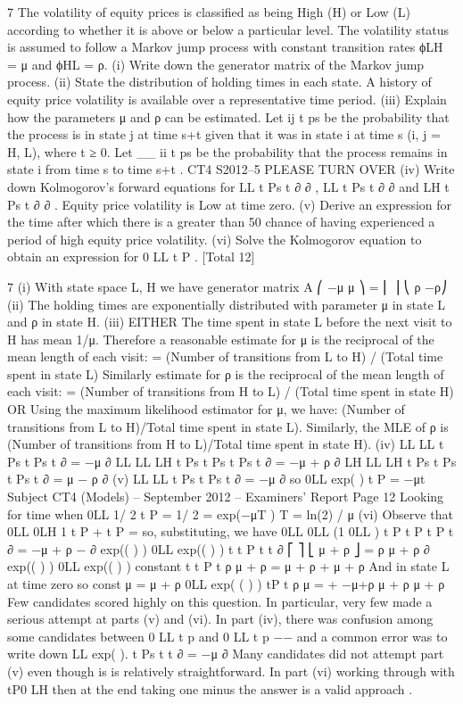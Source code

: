 7 The volatility of equity prices is classified as being High (H) or Low (L) according to
whether it is above or below a particular level. The volatility status is assumed to
follow a Markov jump process with constant transition rates ϕLH = μ and ϕHL = ρ.
(i) Write down the generator matrix of the Markov jump process. 
(ii) State the distribution of holding times in each state. 
A history of equity price volatility is available over a representative time period.
(iii) Explain how the parameters μ and ρ can be estimated. 
Let ij
t ps be the probability that the process is in state j at time s+t given that it was in
state i at time s (i, j = H, L), where t ≥ 0. Let
__
ii
t ps be the probability that the process
remains in state i from time s to time s+t .
CT4 S2012–5 PLEASE TURN OVER
(iv) Write down Kolmogorov’s forward equations for LL
t Ps
t
∂
∂
, LL
t Ps
t
∂
∂
and
LH
t Ps
t
∂
∂
. 
Equity price volatility is Low at time zero.
(v) Derive an expression for the time after which there is a greater than 50%
chance of having experienced a period of high equity price volatility. 
(vi) Solve the Kolmogorov equation to obtain an expression for 0
LL
t P . 
[Total 12]


7
(i) With state space {L, H} we have generator matrix
A
⎛ −μ μ ⎞
= ⎜ ⎟ ⎝ ρ −ρ⎠
(ii) The holding times are exponentially distributed with parameter μ in state L and ρ in
state H.
(iii) EITHER
The time spent in state L before the next visit to H has mean 1/μ.
Therefore a reasonable estimate for μ is the reciprocal of the mean length of each
visit:
= (Number of transitions from L to H) / (Total time spent in state L)
Similarly estimate for ρ is the reciprocal of the mean length of each visit:
= (Number of transitions from H to L) / (Total time spent in state H)
OR
Using the maximum likelihood estimator for μ, we have:
(Number of transitions from L to H)/Total time spent in state L).
Similarly, the MLE of ρ is
(Number of transitions from H to L)/Total time spent in state H).
(iv) LL LL
t Ps t Ps
t
∂
= −μ
∂
LL LL LH
t Ps t Ps t Ps
t
∂
= −μ + ρ
∂
LH LL LH
t Ps t Ps t Ps
t
∂
= μ − ρ
∂
(v) LL LL
t Ps t Ps
t
∂
= −μ
∂
so 0LL exp( )
t P = −μt
Subject CT4 (Models) – September 2012 – Examiners’ Report
Page 12
Looking for time when 0LL 1/ 2
t P =
1/ 2 = exp(−μT )
T = ln(2) / μ
(vi) Observe that 0LL 0LH 1
t P + t P =
so, substituting, we have
0LL 0LL (1 0LL )
t P t P t P
t
∂
= −μ + ρ −
∂
exp(( ) ) 0LL exp(( ) )
t t P t
t
∂ ⎡ ⎤ ⎣ μ + ρ ⎦ = ρ μ + ρ ∂
exp(( ) ) 0LL exp(( ) ) constant
t t P t
ρ
μ + ρ = μ + ρ +
μ + ρ
And in state L at time zero so const
μ
=
μ + ρ
0LL exp( ( ) )
tP t
ρ μ
= + −μ+ρ
μ + ρ μ + ρ
Few candidates scored highly on this question. In particular, very few made a serious
attempt at parts (v) and (vi). In part (iv), there was confusion among some candidates
between 0
LL
t p and 0
LL
t p
−−
and
a common error was to write down LL exp( ).
t Ps t
t
∂
= −μ
∂
Many candidates did not attempt part (v) even though is is relatively straightforward.
In part (vi) working through with tP0
LH then at the end taking one minus the answer is a valid
approach .

